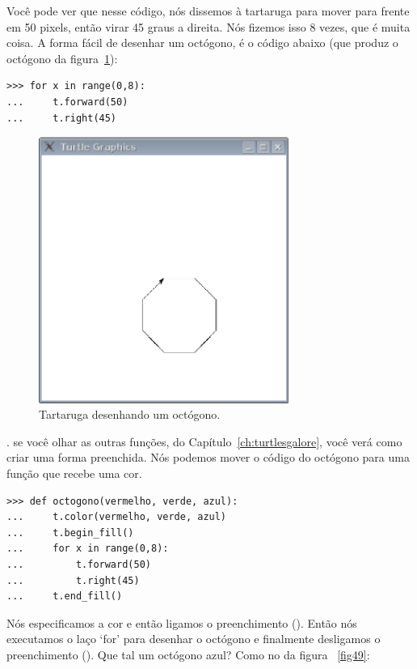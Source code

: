 \noindent
Você pode ver que nesse código, nós dissemos à tartaruga para mover para frente em 50 pixels, então virar 45 graus a direita. Nós fizemos isso 8 vezes, que é muita coisa. A forma fácil de desenhar um octógono, é o código abaixo (que produz o octógono da figura~\ref{fig48}):

\begin{listing}
\begin{verbatim}
>>> for x in range(0,8):
...     t.forward(50)
...     t.right(45)
\end{verbatim}
\end{listing}

\begin{figure}
\begin{center}
\includegraphics[width=82mm]{eps/figure48.eps}
\end{center}
\caption{Tartaruga desenhando um octógono.}\label{fig48}
\end{figure}

. se você olhar as outras funções, do Capítulo~\ref{ch:turtlesgalore}, você verá como criar uma forma preenchida. Nós podemos mover o código do octógono para uma função que recebe uma cor.

\begin{listing}
\begin{verbatim}
>>> def octogono(vermelho, verde, azul):
...     t.color(vermelho, verde, azul)
...     t.begin_fill()
...     for x in range(0,8):
...         t.forward(50)
...         t.right(45)
...     t.end_fill()
\end{verbatim}
\end{listing}

Nós especificamos a cor e então ligamos o preenchimento (). Então nós executamos o laço `for' para desenhar o octógono e finalmente desligamos o preenchimento (). Que tal um octógono azul? Como no da figura ~\ref{fig49}:

